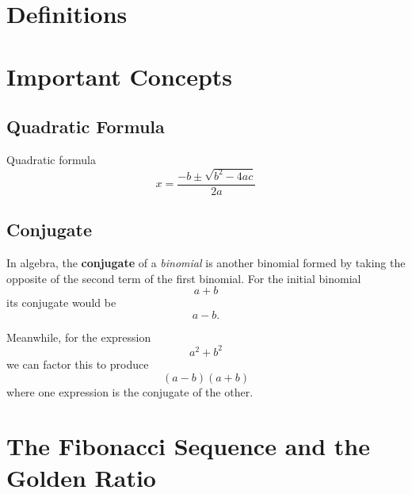 \chapter{Definitions}

\chapter{Important Concepts}

\section{Quadratic Formula}
Quadratic formula
\begin{equation}
  x=\frac{-b\pm\sqrt{b^2-4ac}}{2a}
  \label{app:eq:quadratic}
\end{equation}

\section{Conjugate}\label{app:def:conjugate}

In algebra, the \textbf{conjugate} of a \emph{binomial} is another binomial formed by taking the opposite of the second term of the first binomial. For the initial binomial
\[ a + b\]
its conjugate would be
\[a - b.\]

Meanwhile, for the expression \[a^2+b^2\] we can factor this to produce \[(a-b)(a+b)\] where one expression is the conjugate of the other.



\chapter{The Fibonacci Sequence and the Golden Ratio}

